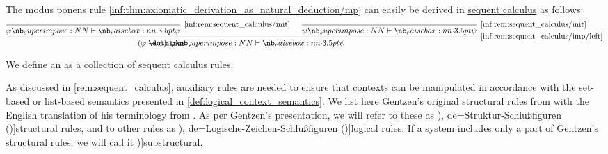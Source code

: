 \begin{example}\label{ex:sequent_calculus_modus_ponens}
  The modus ponens rule \ref{inf:thm:axiomatic_derivation_as_natural_deduction/mp} can easily be derived in \hyperref[rem:sequent_calculus]{sequent calculus} as follows:
  \begin{equation*}
    \begin{prooftree}
      \infer0[\ref{inf:rem:sequent_calculus/init}]{ \varphi \synvdash \varphi }
      \infer0[\ref{inf:rem:sequent_calculus/init}]{ \psi \synvdash \psi }
      \infer2[\ref{inf:rem:sequent_calculus/imp/left}]{ (\varphi \synimplies \psi), \varphi \synvdash \psi }
    \end{prooftree}
  \end{equation*}
\end{example}

\begin{definition}\label{def:abstract_sequent_calculus_system}\mimprovised
  We define an  as a collection of \hyperref[def:sequent_calculus_rule]{sequent calculus rules}.

  As discussed in \cref{rem:sequent_calculus}, auxiliary rules are needed to ensure that contexts can be manipulated in accordance with the set-based or list-based semantics presented in \cref{def:logical_context_semantics}. We list here Gentzen's original structural rules from \cite[192]{Gentzen1935LogischeSchließen} with the English translation of his terminology from \cite[296]{Gentzen1964LogicalDeduction}. As per Gentzen's presentation, we will refer to these as \term[ru=структурные правила (\cite[97]{КолмогоровДрагалин2006Логика}), de=Struktur-Schlu\ss{}figuren (\cite[191]{Gentzen1935LogischeSchließen})]{structural rules}, and to other rules as \term[ru=логические правила (\cite[97]{КолмогоровДрагалин2006Логика}), de=Logische-Zeichen-Schlu\ss{}figuren (\cite[191]{Gentzen1935LogischeSchließen})]{logical rules}. If a system includes only a part of Gentzen's structural rules, we will call it \term[en=substructural (\cite[91]{TroelstraSchwichtenberg2000BasicProofTheory})]{substructural}.


\end{definition}
